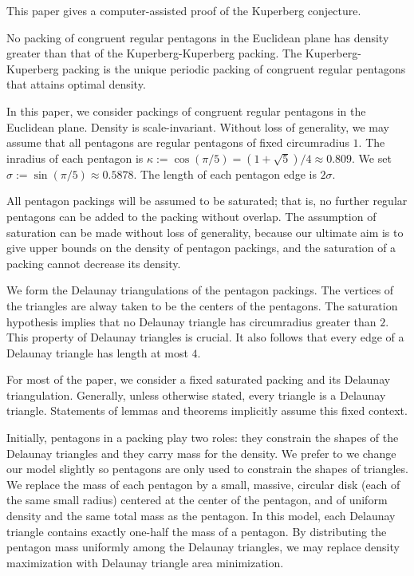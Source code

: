
This paper gives a computer-assisted proof of the Kuperberg conjecture.


\begin{theorem}\label{thm:main}  No packing of congruent regular pentagons in the Euclidean
plane has density greater than that of
the Kuperberg-Kuperberg packing.   The Kuperberg-Kuperberg packing is the
unique periodic packing of congruent regular pentagons that attains optimal density.
\end{theorem}



In this paper, we consider packings of congruent regular pentagons in
the Euclidean plane.   Density is scale-invariant.  Without loss of generality,
we may assume that all pentagons are regular pentagons of fixed
circumradius $1$.  The inradius of each pentagon is $\kappa:= \cos
(\pi/5) = (1+\sqrt{5})/4 \approx 0.809$. We set $\sigma := \sin(\pi/5)
\approx 0.5878$.  The length of each pentagon edge is $2\sigma$.

All pentagon packings will be assumed to be saturated; that is, no
further regular pentagons can be added to the packing without overlap.
The assumption of saturation can be made without loss of generality,
because our ultimate aim is to give upper bounds on the density of
pentagon packings, and the saturation of a packing cannot decrease its
density.

We form the Delaunay triangulations of the pentagon packings.  The
vertices of the triangles are alway taken to be the centers of the
pentagons.  The saturation hypothesis implies that no Delaunay
triangle has circumradius greater than $2$.  This property of Delaunay
triangles is crucial.  It also follows that every edge of a Delaunay
triangle has length at most $4$.

For most of the paper, we consider a fixed saturated packing and its
Delaunay triangulation.  Generally, unless otherwise stated,
every triangle is a  Delaunay triangle.
Statements of lemmas and theorems implicitly
assume this fixed context.

Initially, pentagons in a packing play two roles: they constrain the
shapes of the Delaunay triangles and they carry mass for the density.
We prefer to we change our model slightly so pentagons are only used
to constrain the shapes of triangles.  We replace the mass of each
pentagon by a small, massive, circular disk (each of the same small
radius) centered at the center of the pentagon, and of uniform density
and the same total mass as the pentagon.  In this model, each Delaunay
triangle contains exactly one-half the mass of a pentagon.  By
distributing the pentagon mass uniformly among the Delaunay triangles,
we may replace density maximization with Delaunay triangle area
minimization.

